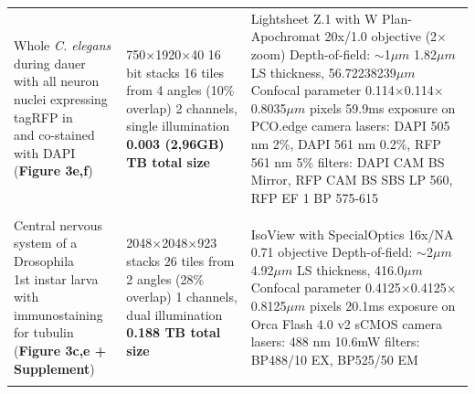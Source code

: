 \documentclass[]{spie}  %
\begin{document}
\begin{landscape}
{\begin{longtable}{lll}
                              \makecell[l]{Whole \emph{C. elegans} during dauer \\with all neuron nuclei expressing tagRFP in \\and co-stained with DAPI (\textbf{Figure 3e,f})} &  \makecell[l]{750$\times$1920$\times$40 16 bit stacks\\16 tiles from 4 angles (10\% overlap) \\2 channels, single illumination\\\textbf{0.003 (2,96GB) TB total size}}  &  \makecell[l]{Lightsheet Z.1 with W Plan-Apochromat 20x/1.0 objective (2$\times$ zoom)\\ Depth-of-field: $\sim$1$\mu{}m$\\1.82$\mu{}m$ LS thickness, 56.72238239$\mu{}m$ Confocal parameter\\0.114$\times$0.114$\times$0.8035$\mu{}m$ pixels\\59.9ms exposure on PCO.edge camera\\lasers: DAPI 505 nm 2\%, DAPI 561 nm 0.2\%, RFP 561 nm 5\%\\filters: DAPI CAM BS Mirror, RFP CAM BS SBS LP 560, RFP EF 1 BP 575-615} \\ \\
                          \makecell[l]{Central nervous system of a Drosophila\\ 1st instar larva with immunostaining \\for tubulin (\textbf{Figure 3c,e + Supplement})} &                     \makecell[l]{2048$\times$2048$\times$923 stacks\\26 tiles from 2 angles (28\% overlap) \\1 channels, dual illumination\\\textbf{0.188 TB total size}}  &                                                                                                                \makecell[l]{IsoView with SpecialOptics 16x/NA 0.71 objective\\ Depth-of-field: $\sim$2$\mu{}m$ \\4.92$\mu{}m$ LS thickness, 416.0$\mu{}m$ Confocal parameter\\0.4125$\times$0.4125$\times$0.8125$\mu{}m$ pixels\\20.1ms exposure on Orca Flash 4.0 v2 sCMOS camera\\lasers: 488 nm 10.6mW\\filters: BP488/10 EX, BP525/50 EM } \\ \\


\end{longtable}}
\end{landscape}
\end{document}
